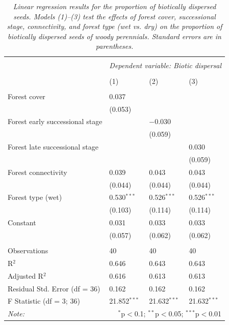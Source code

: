 \newpage
\begin{table}[H]
\centering
\scriptsize %
\caption{\textit{Linear regression results for the proportion of biotically dispersed seeds. Models (1)–(3) test the effects of forest cover, successional stage, connectivity, and forest type (wet vs. dry) on the proportion of biotically dispersed seeds of woody perennials. Standard errors are in parentheses.}}
\begin{tabularx}{\textwidth}{@{\extracolsep{3pt}}lXXX} 
\\[-1ex]\hline 
\hline \\[-1ex] 
 & \multicolumn{3}{c}{\textit{Dependent variable: Biotic dispersal}} \\ 
\\[-1ex] & (1) & (2) & (3)\\ 
\hline \\[-0.8ex] 
Forest cover & 0.037 &  &  \\ 
 & (0.053) &  &  \\ 
Forest early successional stage &  & $-$0.030 &  \\ 
 &  & (0.059) &  \\ 
Forest late successional stage &  &  & 0.030 \\ 
 &  &  & (0.059) \\ 
Forest connectivity & 0.039 & 0.043 & 0.043 \\ 
 & (0.044) & (0.044) & (0.044) \\ 
Forest type (wet) & 0.530$^{***}$ & 0.526$^{***}$ & 0.526$^{***}$ \\ 
 & (0.103) & (0.114) & (0.114) \\ 
Constant & 0.031 & 0.033 & 0.033 \\ 
 & (0.057) & (0.062) & (0.062) \\ 
\hline \\[-0.8ex] 
Observations & 40 & 40 & 40 \\ 
R$^{2}$ & 0.646 & 0.643 & 0.643 \\ 
Adjusted R$^{2}$ & 0.616 & 0.613 & 0.613 \\ 
Residual Std. Error (df = 36) & 0.162 & 0.162 & 0.162 \\ 
F Statistic (df = 3; 36) & 21.852$^{***}$ & 21.632$^{***}$ & 21.632$^{***}$ \\ 
\hline 
\textit{Note:} & \multicolumn{3}{r}{$^{*}$p$<$0.1; $^{**}$p$<$0.05; $^{***}$p$<$0.01} \\ 
\end{tabularx} 
\label{tab:biotic}
\end{table} 

